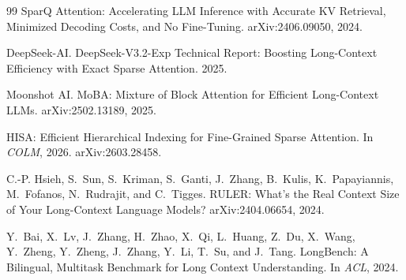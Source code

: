 \documentclass[11pt]{article}
\begin{document}
\begin{thebibliography}{99}
SparQ Attention: Accelerating LLM Inference with Accurate KV Retrieval, Minimized Decoding Costs, and No Fine-Tuning. arXiv:2406.09050, 2024.

DeepSeek-AI. DeepSeek-V3.2-Exp Technical Report: Boosting Long-Context Efficiency with Exact Sparse Attention. 2025.

Moonshot AI. MoBA: Mixture of Block Attention for Efficient Long-Context LLMs. arXiv:2502.13189, 2025.

HISA: Efficient Hierarchical Indexing for Fine-Grained Sparse Attention. In \emph{COLM}, 2026. arXiv:2603.28458.

C.-P. Hsieh, S.~Sun, S.~Kriman, S.~Ganti, J.~Zhang, B.~Kulis, K.~Papayiannis, M.~Fofanos, N.~Rudrajit, and C.~Tigges. RULER: What's the Real Context Size of Your Long-Context Language Models? arXiv:2404.06654, 2024.

Y.~Bai, X.~Lv, J.~Zhang, H.~Zhao, X.~Qi, L.~Huang, Z.~Du, X.~Wang, Y.~Zheng, Y.~Zheng, J.~Zhang, Y.~Li, T.~Su, and J.~Tang. LongBench: A Bilingual, Multitask Benchmark for Long Context Understanding. In \emph{ACL}, 2024.

\end{thebibliography}
\end{document}
